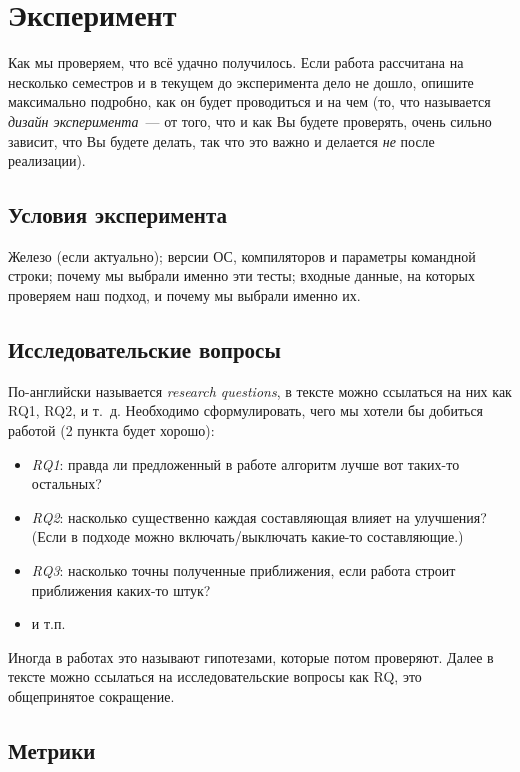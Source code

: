
\section{Эксперимент}
Как мы проверяем, что всё удачно получилось. Если работа рассчитана на несколько семестров и в текущем до эксперимента дело не дошло, опишите максимально подробно, как он будет прово\-диться и на чем (то, что называется \emph{дизайн эксперимента}~--- от того, что и как Вы будете проверять, очень сильно зависит, что Вы будете делать, так что это важно и делается \emph{не} после реализации).

\subsection{Условия эксперимента}
Железо (если актуально);  версии ОС, компиляторов и параметры командной строки; почему мы выбрали именно эти тесты; входные дан\-ные, на которых проверяем наш подход, и почему мы выбрали именно их.

\subsection{Исследовательские вопросы }
По-английски называется \emph{research questions}, в тексте можно ссылаться на них как RQ1, RQ2, и т.~д.
Необходимо сформулировать, чего мы хотели бы добиться работой (2 пункта будет хорошо):

\begin{itemize}
    \item \emph{RQ1}: правда ли предложенный в работе алгоритм лучше вот таких-то остальных?
    \item \emph{RQ2}: насколько существенно каждая составляющая влияет на улучшения? (Если в подходе можно включать/выключать какие-то составляющие.)
    \item \emph{RQ3}: насколько точны полученные приближения, если работа строит приближения каких-то штук?
    \item и т.п.
\end{itemize}

Иногда в работах это называют гипотезами, которые потом проверяют. Далее в тексте можно ссылаться на исследовательские вопросы как \textsc{RQ}, это обще\-при\-нятое сокращение.

\subsection{Метрики}

